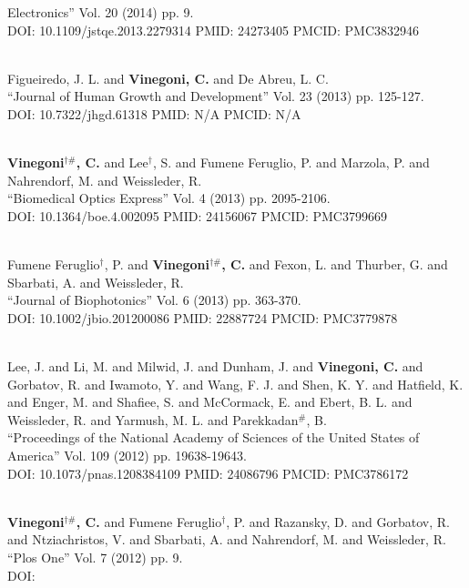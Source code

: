 Electronics'' Vol. 20 (2014) pp. 9. \\ DOI: 10.1109/jstqe.2013.2279314 PMID: 24273405 PMCID: PMC3832946\item {} \\ Figueiredo, J. L. and {\bf Vinegoni, C.} and De Abreu, L. C. \\ ``Journal of Human Growth and Development'' Vol. 23 (2013) pp. 125-127. \\ DOI: 10.7322/jhgd.61318 PMID: N/A PMCID: N/A\item {} \\ {\bf Vinegoni$^{\dag \#}$, C.} and Lee$^\dag$, S. and Fumene Feruglio, P. and Marzola, P. and Nahrendorf, M. and Weissleder, R. \\ ``Biomedical Optics Express'' Vol. 4 (2013) pp. 2095-2106. \\ DOI: 10.1364/boe.4.002095 PMID: 24156067 PMCID: PMC3799669\item {} \\ Fumene Feruglio$^\dag$, P. and {\bf Vinegoni$^{\dag \#}$, C.} and Fexon, L. and Thurber, G. and Sbarbati, A. and Weissleder, R. \\ ``Journal of Biophotonics'' Vol. 6 (2013) pp. 363-370. \\ DOI: 10.1002/jbio.201200086 PMID: 22887724 PMCID: PMC3779878\item {} \\ Lee, J. and Li, M. and Milwid, J. and Dunham, J. and {\bf Vinegoni, C.} and Gorbatov, R. and Iwamoto, Y. and Wang, F. J. and Shen, K. Y. and Hatfield, K. and Enger, M. and Shafiee, S. and McCormack, E. and Ebert, B. L. and Weissleder, R. and Yarmush, M. L. and Parekkadan$^\#$, B. \\ ``Proceedings of the National Academy of Sciences of the United States of America'' Vol. 109 (2012) pp. 19638-19643. \\ DOI: 10.1073/pnas.1208384109 PMID: 24086796 PMCID: PMC3786172\item {} \\ {\bf Vinegoni$^{\dag \#}$, C.} and Fumene Feruglio$^\dag$, P. and Razansky, D. and Gorbatov, R. and Ntziachristos, V. and Sbarbati, A. and Nahrendorf, M. and Weissleder, R. \\ ``Plos One'' Vol. 7 (2012) pp. 9. \\ DOI: 